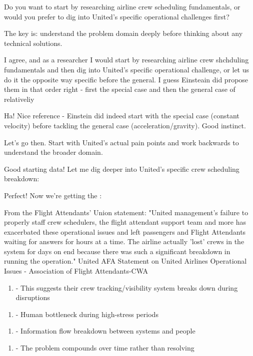 Do you want to start by researching airline crew scheduling fundamentals, or would you prefer to dig into United's specific operational challenges first?

The key is: understand the problem domain deeply before thinking about any technical solutions.


I agree, and as a researcher I would start by researching airline crew shchduling fundamentals and then dig into United's specific operational challenge, or let us do it the opposite way specific before the general. I guess Einsteain did propose them in that order right - first the special case and then the general case of relativeliy


Ha! Nice reference - Einstein did indeed start with the special case (constant velocity) before tackling the general case (acceleration/gravity). Good instinct.

Let's go 
 then. Start with United's actual pain points and work backwards to understand the broader domain.

Good starting data! Let me dig deeper into United's specific crew scheduling breakdown:

Perfect! Now we're getting the 
:


From the Flight Attendants' Union statement: "United management's failure to properly staff crew schedulers, the flight attendant support team and more has exacerbated these operational issues and left passengers and Flight Attendants waiting for answers for hours at a time. The airline actually 'lost' crews in the system for days on end because there was such a significant breakdown in running the operation." 
United AFA Statement on United Airlines Operational Issues - Association of Flight Attendants-CWA


\begin{enumerate}
\item {} - This suggests their crew tracking/visibility system breaks down during disruptions
\end{enumerate}
\begin{enumerate}
\item {} - Human bottleneck during high-stress periods
\end{enumerate}
\begin{enumerate}
\item {} - Information flow breakdown between systems and people
\end{enumerate}
\begin{enumerate}
\item {} - The problem compounds over time rather than resolving
\end{enumerate}

